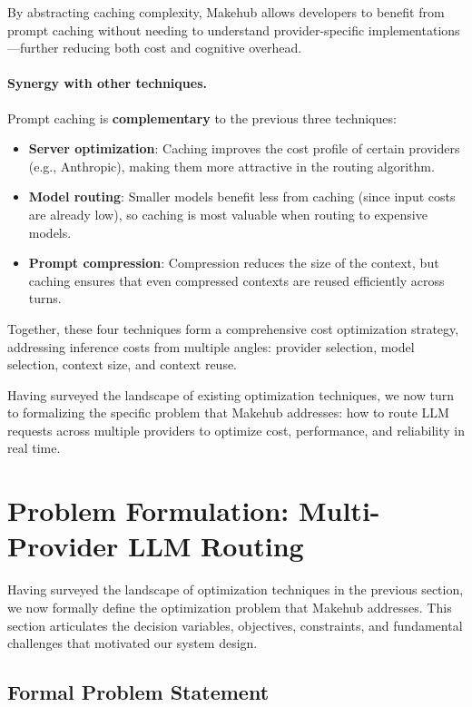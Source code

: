 \documentclass[english]{article}
\begin{document}
By abstracting caching complexity, Makehub allows developers to benefit from prompt caching without needing to understand provider-specific implementations—further reducing both cost and cognitive overhead.

\paragraph{Synergy with other techniques.}

Prompt caching is \textbf{complementary} to the previous three techniques:
\begin{itemize}
    \item \textbf{Server optimization}: Caching improves the cost profile of certain providers (e.g., Anthropic), making them more attractive in the routing algorithm.
    \item \textbf{Model routing}: Smaller models benefit less from caching (since input costs are already low), so caching is most valuable when routing to expensive models.
    \item \textbf{Prompt compression}: Compression reduces the size of the context, but caching ensures that even compressed contexts are reused efficiently across turns.
\end{itemize}

Together, these four techniques form a comprehensive cost optimization strategy, addressing inference costs from multiple angles: provider selection, model selection, context size, and context reuse.

Having surveyed the landscape of existing optimization techniques, we now turn to formalizing the specific problem that Makehub addresses: how to route LLM requests across multiple providers to optimize cost, performance, and reliability in real time.

\newpage
\section{Problem Formulation: Multi-Provider LLM Routing}

Having surveyed the landscape of optimization techniques in the previous section, we now formally define the optimization problem that Makehub addresses. This section articulates the decision variables, objectives, constraints, and fundamental challenges that motivated our system design.

\subsection{Formal Problem Statement}
\end{document}
